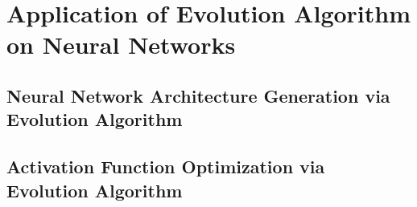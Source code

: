 \section{Application of Evolution Algorithm on Neural Networks}

\subsection{Neural Network Architecture Generation via Evolution Algorithm}

\subsection{Activation Function Optimization via Evolution Algorithm} 